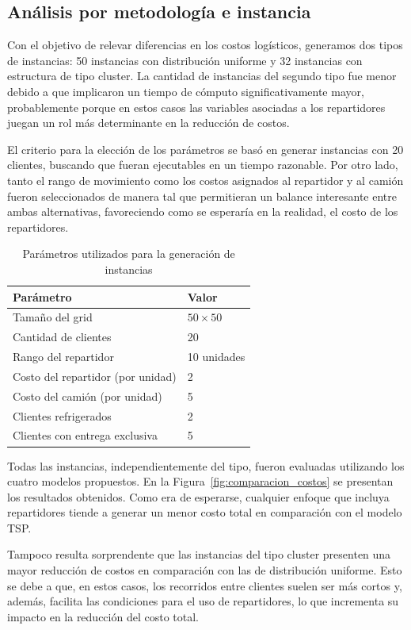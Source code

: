 \documentclass[10pt]{article}
\begin{document}
\subsection{Análisis por metodología e instancia}
Con el objetivo de relevar diferencias en los costos logísticos, generamos dos tipos de instancias: 50 instancias con distribución uniforme y 32 instancias con estructura de tipo cluster. La cantidad de instancias del segundo tipo fue menor debido a que implicaron un tiempo de cómputo significativamente mayor, probablemente porque en estos casos las variables asociadas a los repartidores juegan un rol más determinante en la reducción de costos.

El criterio para la elección de los parámetros se basó en generar instancias con 20 clientes, buscando que fueran ejecutables en un tiempo razonable. Por otro lado, tanto el rango de movimiento como los costos asignados al repartidor y al camión fueron seleccionados de manera tal que permitieran un balance interesante entre ambas alternativas, favoreciendo como se esperaría en la realidad, el costo de los repartidores.
\clearpage

\begin{table}[htbp]
	\centering
	\begin{tabular}{ll}
		\hline
		\textbf{Parámetro} & \textbf{Valor} \\
		\hline
		Tamaño del grid & $50 \times 50$ \\
		Cantidad de clientes & 20 \\
		Rango del repartidor & 10 unidades \\
		Costo del repartidor (por unidad) & 2 \\
		Costo del camión (por unidad) & 5 \\
		Clientes refrigerados & 2 \\
		Clientes con entrega exclusiva & 5 \\
		\hline
	\end{tabular}
	\caption{Parámetros utilizados para la generación de instancias}
	\label{tab:parametros_instancias}
\end{table}


Todas las instancias, independientemente del tipo, fueron evaluadas utilizando los cuatro modelos propuestos. En la Figura~\ref{fig:comparacion_costos} se presentan los resultados obtenidos. Como era de esperarse, cualquier enfoque que incluya repartidores tiende a generar un menor costo total en comparación con el modelo TSP.

Tampoco resulta sorprendente que las instancias del tipo cluster presenten una mayor reducción de costos en comparación con las de distribución uniforme. Esto se debe a que, en estos casos, los recorridos entre clientes suelen ser más cortos y, además, facilita las condiciones para el uso de repartidores, lo que incrementa su impacto en la reducción del costo total.
\end{document}
